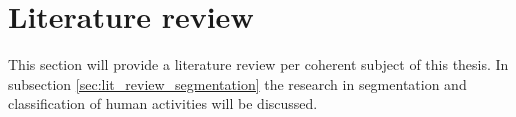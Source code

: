 








\section{Literature review}
This section will provide a literature review per coherent subject of this thesis.
In subsection \ref{sec:lit_review_segmentation} the research in segmentation and classification of human activities will be discussed.


